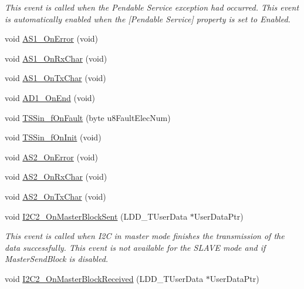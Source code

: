 \begin{DoxyCompactItemize}
\begin{DoxyCompactList}\small\item\em This event is called when the Pendable Service exception had occurred. This event is automatically enabled when the \mbox{[}Pendable Service\mbox{]} property is set to \textquotesingle{}Enabled\textquotesingle{}. \end{DoxyCompactList}\item 
void \hyperlink{group___events__module_ga29fa5834e7c66a52898789186851847d}{A\+S1\+\_\+\+On\+Error} (void)
\item 
void \hyperlink{group___events__module_gac72aa34766c66a614f29b1267cadfccc}{A\+S1\+\_\+\+On\+Rx\+Char} (void)
\item 
void \hyperlink{group___events__module_gad4ca2c06cb7fdb57a52811247371565c}{A\+S1\+\_\+\+On\+Tx\+Char} (void)
\item 
void \hyperlink{group___events__module_gac0b0e33c722d75df2e7b6eb1d50f15a7}{A\+D1\+\_\+\+On\+End} (void)
\item 
void \hyperlink{group___events__module_gaaade020d27159f2102fb3b994d1224ae}{T\+S\+Sin\+\_\+f\+On\+Fault} (byte u8\+Fault\+Elec\+Num)
\item 
void \hyperlink{group___events__module_ga67e29a27a74c8a25e4edddb84351a138}{T\+S\+Sin\+\_\+f\+On\+Init} (void)
\item 
void \hyperlink{group___events__module_ga0137853d241c656b6bf6653ebfc64cac}{A\+S2\+\_\+\+On\+Error} (void)
\item 
void \hyperlink{group___events__module_gadc4e66d9db0a63b063b37ad5a70a10be}{A\+S2\+\_\+\+On\+Rx\+Char} (void)
\item 
void \hyperlink{group___events__module_ga745f5ad3a73381f935cc2ee2fec5c34f}{A\+S2\+\_\+\+On\+Tx\+Char} (void)
\item 
void \hyperlink{group___events__module_ga23f378d5253016b341bf971cb5c35ee7}{I2\+C2\+\_\+\+On\+Master\+Block\+Sent} (L\+D\+D\+\_\+\+T\+User\+Data $\ast$User\+Data\+Ptr)
\begin{DoxyCompactList}\small\item\em This event is called when I2C in master mode finishes the transmission of the data successfully. This event is not available for the S\+L\+A\+VE mode and if Master\+Send\+Block is disabled. \end{DoxyCompactList}\item 
void \hyperlink{group___events__module_ga5b2fe0871600de8d73184570a42e5b66}{I2\+C2\+\_\+\+On\+Master\+Block\+Received} (L\+D\+D\+\_\+\+T\+User\+Data $\ast$User\+Data\+Ptr)

\end{DoxyCompactItemize}
